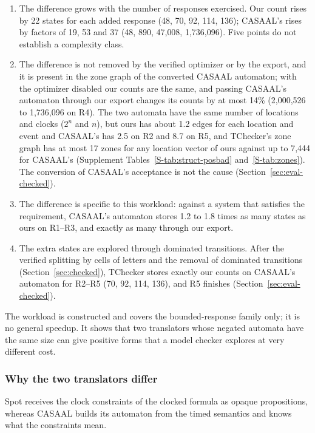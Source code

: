 \begin{enumerate}
\item The difference grows with the number of responses exercised. Our count rises by 22 states for each added response (48, 70, 92, 114, 136); CASAAL's rises by factors of 19, 53 and 37 (48, 890, 47{,}008, 1{,}736{,}096). Five points do not establish a complexity class.
\item The difference is not removed by the verified optimizer or by the export, and it is present in the zone graph of the converted CASAAL automaton; with the optimizer disabled our counts are the same, and passing CASAAL's automaton through our export changes its counts by at most 14\% (2{,}000{,}526 to 1{,}736{,}096 on R4). The two automata have the same number of locations and clocks ($2^n$ and $n$), but ours has about 1.2 edges for each location and event and CASAAL's has 2.5 on R2 and 8.7 on R5, and TChecker's zone graph has at most 17 zones for any location vector of ours against up to 7{,}444 for CASAAL's (Supplement Tables~\ref{S-tab:struct-posbad} and~\ref{S-tab:zones}).  The conversion of CASAAL's acceptance is not the cause (Section~\ref{sec:eval-checked}).
\item The difference is specific to this workload: against a system that satisfies the requirement, CASAAL's automaton stores 1.2 to 1.8 times as many states as ours on R1--R3, and exactly as many through our export. 
\item The extra states are explored through dominated transitions. After the verified splitting by cells of letters and the removal of dominated transitions (Section~\ref{sec:checked}), TChecker stores exactly our counts on CASAAL's automaton for R2--R5 (70, 92, 114, 136), and R5 finishes (Section~\ref{sec:eval-checked}).
\end{enumerate}

The workload is constructed and covers the bounded-response family only; it is no general speedup. It shows that two translators whose negated automata have the same size can give positive forms that a model checker explores at very different cost.  

\subsubsection{Why the two translators differ}
\label{sec:casaal-why}
Spot receives the clock constraints of the clocked formula as opaque propositions, whereas CASAAL builds its automaton from the timed semantics and knows what the constraints mean. 



